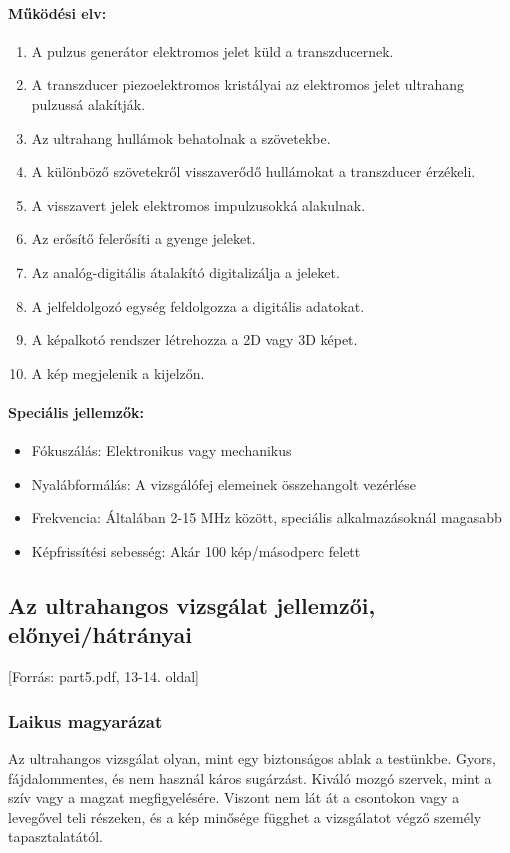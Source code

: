 \documentclass[a4paper,12pt]{article}
\begin{document}
\paragraph{Működési elv:} \begin{enumerate} \item A pulzus generátor elektromos jelet küld a transzducernek. \item A transzducer piezoelektromos kristályai az elektromos jelet ultrahang pulzussá alakítják. \item Az ultrahang hullámok behatolnak a szövetekbe. \item A különböző szövetekről visszaverődő hullámokat a transzducer érzékeli. \item A visszavert jelek elektromos impulzusokká alakulnak. \item Az erősítő felerősíti a gyenge jeleket. \item Az analóg-digitális átalakító digitalizálja a jeleket. \item A jelfeldolgozó egység feldolgozza a digitális adatokat. \item A képalkotó rendszer létrehozza a 2D vagy 3D képet. \item A kép megjelenik a kijelzőn. \end{enumerate}

\paragraph{Speciális jellemzők:} \begin{itemize} \item Fókuszálás: Elektronikus vagy mechanikus \item Nyalábformálás: A vizsgálófej elemeinek összehangolt vezérlése \item Frekvencia: Általában 2-15 MHz között, speciális alkalmazásoknál magasabb \item Képfrissítési sebesség: Akár 100 kép/másodperc felett \end{itemize}

\subsection{Az ultrahangos vizsgálat jellemzői, előnyei/hátrányai} [Forrás: part5.pdf, 13-14. oldal]

\subsubsection{Laikus magyarázat} Az ultrahangos vizsgálat olyan, mint egy biztonságos ablak a testünkbe. Gyors, fájdalommentes, és nem használ káros sugárzást. Kiváló mozgó szervek, mint a szív vagy a magzat megfigyelésére. Viszont nem lát át a csontokon vagy a levegővel teli részeken, és a kép minősége függhet a vizsgálatot végző személy tapasztalatától.
\end{document}
